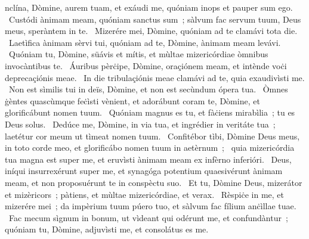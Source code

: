 \psalmChapterWithInscription{}
{ }
{%
nclína, Dòmine, aurem tuam, et exáudi me, quóniam inops et pauper sum ego. 
~Custódi ànimam meam, quóniam sanctus sum~; sàlvum fac servum tuum, Deus meus, speràntem in te. 
~Mizerére mei, Dòmine, quóniam ad te clamávi tota die. 
~Laetìfica ànimam sèrvi tui, quóniam ad te, Dòmine, ànimam meam levávi. 
~Quóniam tu, Dòmine, süávis et mítis, et mùltae mizericórdiae òmnibus invocàntibus te. 
~Áuribus pèrċipe, Dòmine, oraçiónem meam, et intènde voċi deprecaçiónis meae. 
~In die tribulaçiónis meae clamávi ad te, quia exaudivìsti me. 
~Non est sìmilis tui in deïs, Dòmine, et non est secùndum ópera tua. 
~Òmnes ġèntes quascùmque feċìsti vènient, et adorábunt coram te, Dòmine, et glorificábunt nomen tuum. 
~Quóniam magnus es tu, et fàċiens mirabìlia~; tu es Deus solus. 
~Dedúce me, Dòmine, in via tua, et ingrédier in veritáte tua~; laetétur cor meum ut tìmeat nomen tuum. 
~Confitébor tìbi, Dòmine Deus meus, in toto corde meo, et glorificábo nomen tuum in aetèrnum~; 
~quia mizericórdia tua magna est super me, et eruvìsti ànimam meam ex infèrno inferióri. 
~Deus, iníqui insurrexérunt super me, et synagóga potentium quaesivérunt ànimam meam, et non proposuérunt te in conspèctu suo. 
~Et tu, Dòmine Deus, mizerátor et mizèricors~; pàtiens, et mùltae mizericórdiae, et verax. 
~Rèspiċe in me, et mizerére mei~; da impèrium tuum púero tuo, et sàlvum fac fílium anċìllae tuae. 
~Fac mecum sìgnum in bonum, ut vìdeant qui odérunt me, et confundàntur~; quóniam tu, Dòmine, adjuvìsti me, et consolátus es me. 
}
